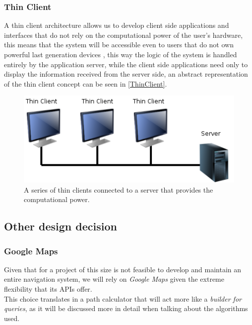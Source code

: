 \subsubsection{Thin Client}
\label{ThinClient}
A thin client architecture allows us to develop client side applications and interfaces that do not rely on the computational power of the user's hardware, this means that the system will be accessible even to users that do not own powerful last generation devices , this way the logic of the system is handled entirely by the application server, while the client side applications need only to display the information received from the server side, an abstract representation of the thin client concept can be seen in \autoref{ThinClient}.
\begin{figure}[h]
\includegraphics[]{Img/ThinClients}
\caption{A series of thin clients connected to a server that provides the computational power.}
\label{ThinClient}
\end{figure}

\clearpage
\subsection{Other design decision}
\subsubsection{Google Maps}
Given that for a project of this size is not feasible to develop and maintain an entire navigation system, we will rely on \emph{Google Maps} given the extreme flexibility that its APIs offer.\\
This choice translates in a path calculator that will act more like a \textit{builder for queries}, as it will be discussed more in detail when talking about the algorithms used.


